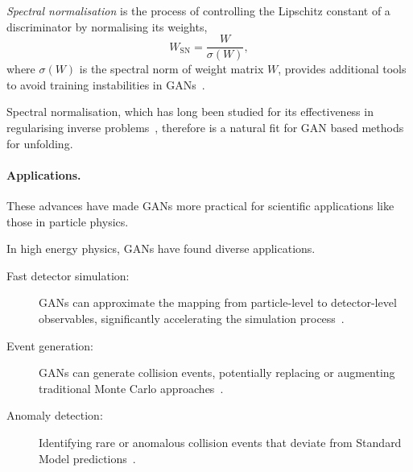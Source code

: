         \begin{definition}
        \emph{Spectral normalisation} is the process of controlling the Lipschitz constant of a discriminator by normalising its weights,
        \begin{equation}
            W_{\text{SN}} = \frac{W}{\sigma(W)},
        \end{equation}
        where \(\sigma(W)\) is the spectral norm of weight matrix \(W\), provides additional tools to avoid training instabilities in GANs~\cite{Terjek2019AdversarialRegularization, miyato_spectral_2018}.
        \end{definition}
        Spectral normalisation, which has long been studied for its effectiveness in regularising inverse problems~\cite{Clason2021RegularizationProblems, Engl2020RegularizationProblems, hansen_6_2006}, therefore is a natural fit for GAN based methods for unfolding.

        \paragraph{Applications.}
            These advances have made GANs more practical for scientific applications like those in particle physics.
        
            In high energy physics, GANs have found diverse applications.
            \begin{description}
                \item[Fast detector simulation:] GANs can approximate the mapping from particle-level to detector-level observables, significantly accelerating the simulation process~\cite{maevskiy_generative_2023, rogachev_gan_2023, Paganini2018CaloGANNetworks, bandieramonte_fastcalogan_2023, giannelli_caloshowergan_2024, khattak_fast_2022}.
                \item [Event generation:] GANs can generate collision events, potentially replacing or augmenting traditional Monte Carlo approaches~\cite{butter_how_2019, di_sipio_dijetgan_2019}.
                \item[Anomaly detection:] Identifying rare or anomalous collision events that deviate from Standard Model predictions~\cite{vaslin_gan-ae_2023, DiMattia2019ADetection, Belis2024MachinePhysics, Knapp2021AdversariallyQuark}.
            \end{description}

